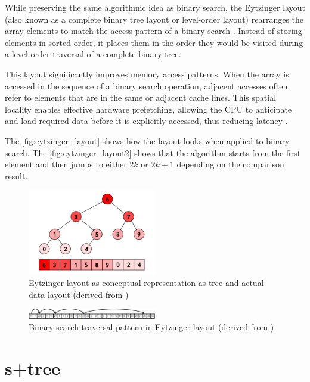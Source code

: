 While preserving the same algorithmic idea as binary search, the Eytzinger layout (also known as a complete binary tree layout or level-order layout) rearranges the array elements to match the access pattern of a binary search \citep{binary_search}. Instead of storing elements in sorted order, it places them in the order they would be visited during a level-order traversal of a complete binary tree.

This layout significantly improves memory access patterns. When the array is accessed in the sequence of a binary search operation, adjacent accesses often refer to elements that are in the same or adjacent cache lines. This spatial locality enables effective hardware prefetching, allowing the CPU to anticipate and load required data before it is explicitly accessed, thus reducing latency \citep{binary_search}.

The \autoref{fig:eytzinger_layout} shows how the layout looks when applied to binary search. The \autoref{fig:eytzinger_layout2} shows that the algorithm starts from the first element and then jumps to either $2k$ or $2k+1$ depending on the comparison result.

\begin{figure}[ht]
  \centering
  \includegraphics[width=0.5\textwidth]{figs/related_work_theoretical_bg/eytzinger_layout.png}
  \caption{Eytzinger layout as conceptual representation as tree and actual data layout (derived from \citet{binary_search})}
  \label{fig:eytzinger_layout}
\end{figure}
\begin{figure}[ht]
  \centering
  \includegraphics[width=0.5\textwidth]{figs/related_work_theoretical_bg/eytzinger_layout2.png}
  \caption{Binary search traversal pattern in Eytzinger layout (derived from \citet{binary_search})}
  \label{fig:eytzinger_layout2}
\end{figure}

\section{\texorpdfstring{\ac{s+tree}}{S+tree}}
\label{tb:static_btree}

